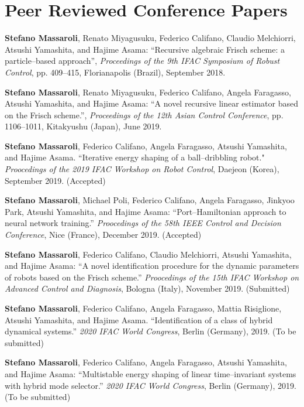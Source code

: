 \section*{Peer Reviewed Conference Papers}
\begin{enumerate}[{[}c1{]}]
\item \textbf{Stefano Massaroli}, Renato Miyagusuku, Federico Califano, Claudio Melchiorri, Atsushi Yamashita, and Hajime Asama: ``Recursive algebraic Frisch scheme: a particle--based approach'', \textit{Proceedings of the 9th IFAC Symposium of Robust Control}, pp. 409--415, Florianapolis (Brazil), September 2018.
%
\item \textbf{Stefano Massaroli}, Renato Miyagusuku, Federico Califano, Angela Faragasso, Atsushi Yamashita, and Hajime Asama: ``A novel recursive linear estimator based on the Frisch scheme.'', \textit{Proceedings of the 12th Asian Control Conference}, pp. 1106--1011, Kitakyushu (Japan), June 2019.
%
\item \textbf{Stefano Massaroli}, Federico Califano, Angela Faragasso, Atsushi Yamashita, and
Hajime Asama. ``Iterative energy shaping of a ball--dribbling robot." \textit{Proocedings of the 2019 IFAC Workshop on Robot Control}, Daejeon (Korea), September 2019. (Accepted)
%
\item \textbf{Stefano Massaroli}, Michael Poli, Federico Califano, Angela Faragasso, Jinkyoo Park, Atsushi Yamashita, and Hajime Asama: ``Port--Hamiltonian approach to neural network training.'' \textit{Proocedings of the 58th IEEE Control and Decision Conference}, Nice (France), December 2019. (Accepted)
%
\item \textbf{Stefano Massaroli}, Federico Califano, Claudio Melchiorri, Atsushi Yamashita, and Hajime Asama: ``A novel identification procedure for the dynamic parameters of robots based on the Frisch scheme.'' \textit{Proocedings of the 15th IFAC Workshop on Advanced Control and Diagnosis}, Bologna (Italy), November 2019. (Submitted)
%
\item \textbf{Stefano Massaroli}, Federico Califano, Angela Faragasso, Mattia Risiglione, Atsushi
Yamashita, and Hajime Asama. ``Identification of a class of hybrid dynamical systems.'' \textit{2020 IFAC World Congress}, Berlin (Germany), 2019. (To be submitted)
%
\item \textbf{Stefano Massaroli}, Federico Califano, Angela Faragasso, Atsushi Yamashita, and Hajime Asama: ``Multistable energy shaping of linear time--invariant systems with hybrid mode selector.'' \textit{2020 IFAC World Congress}, Berlin (Germany), 2019. (To be submitted)
%
\end{enumerate}

